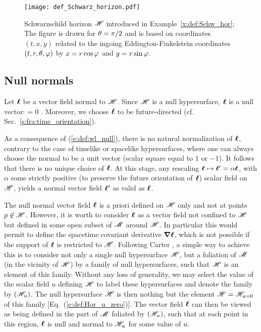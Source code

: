 \begin{figure}
\centerline{\texttt{[image: def\_Schwarz\_horizon.pdf]}}
\caption[]{\label{f:def:Schwarz_horizon} \footnotesize
Schwarzschild horizon $\mathscr{H}$ introduced in Example~\ref{x:def:Schw_hor};
The figure is drawn for $\theta=\pi/2$ and is based on coordinates $(t,x,y)$
related to the ingoing Eddington-Finkelstein coordinates $(t,r,\theta,\varphi)$
by $x=r\cos\varphi$ and $y=r\sin\varphi$.}
\end{figure}



\subsection{Null normals} \label{s:def:null_normal}

Let $\bm{\ell}$ be a vector field normal to $\mathscr{H}$. Since $\mathscr{H}$ is a null hypersurface,
$\bm{\ell}$ is a null vector:
\be \label{e:def:wl_null}
    \wl\cdot\wl = 0 .
\ee
Moreover, we choose $\bm{\ell}$ to be future-directed (cf. Sec.~\ref{s:fra:time_orientation}).

\begin{remark}
As a consequence of (\ref{e:def:wl_null}), there is no natural normalization
of $\bm{\ell}$, contrary to the case of timelike or spacelike hypersurfaces,
where one can always choose the normal to be a unit vector
(scalar square equal to $1$ or $-1$). It follows that there is no unique choice
of $\bm{\ell}$. At this stage, any rescaling $\bm{\ell} \mapsto \bm{\ell}' =  \alpha \bm{\ell}$, with
$\alpha$ some strictly positive (to preserve the future orientation of $\bm{\ell}$)
scalar field on $\mathscr{H}$,
yields a normal vector field $\bm{\ell}'$ as valid as $\bm{\ell}$.
\end{remark}
The null normal vector field $\bm{\ell}$ is a priori defined on $\mathscr{H}$
only and not at points $p\not\in\mathscr{H}$.
However, it is worth to consider $\bm{\ell}$ as a vector field
not confined to $\mathscr{H}$ but defined
in some open subset of $\mathscr{M}$ around $\mathscr{H}$.
In particular this would permit to define the spacetime covariant
derivative $\bm{\nabla}\bm{\ell}$, which is not possible if the
support of $\bm{\ell}$ is restricted to $\mathscr{H}$.
Following Carter \cite{Carte97}, a simple way to achieve
this is to consider not only a single null hypersurface $\mathscr{H}$,
but a foliation of $\mathscr{M}$ (in the vicinity
of $\mathscr{H}$) by a family of null hypersurfaces, such that $\mathscr{H}$ is an
element of this family.
Without any loss of generality,
we may select the value of the scalar field $u$ defining $\mathscr{H}$ to label these hypersurfaces and
denote the family by $(\mathscr{H}_u)$. The null hypersurface $\mathscr{H}$
is then nothing but the element $\mathscr{H} = \mathscr{H}_{u=0}$ of this family
[Eq.~(\ref{e:def:Hor_u_zero})].
The vector field $\bm{\ell}$ can then be viewed as being defined in the part of $\mathscr{M}$
foliated by $(\mathscr{H}_u)$, such that at each point in this region, $\bm{\ell}$
is null and normal to $\mathscr{H}_u$ for some value of $u$.


